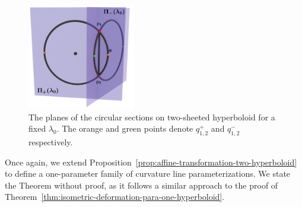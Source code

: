 \documentclass[10pt, a4paper]{article}
\theoremstyle{BoldTopSpacing}
\theoremstyle{BoldTopSpacing}
\theoremstyle{BoldTopSpacing}
\theoremstyle{BoldTopBottomSpacing}
\theoremstyle{BoldTopSpacing}
\theoremstyle{BoldTopBottomSpacing}
\theoremstyle{remark}
\begin{document}
\begin{figure}[H]
    \centering
    \includegraphics[width=0.42\textwidth]{proof_h2_side_view.png}
    \caption[The planes of the circular sections on two-sheeted hyperboloid.]{The planes of the circular sections on two-sheeted hyperboloid for a fixed $\lambda_{0}$. The orange and green points denote $q^{+}_{1,2}$ and $q^{-}_{1,2}$ respectively.}
    \label{fig:proof-h2}
\end{figure}

Once again, we extend Proposition~\ref{prop:affine-transformation-two-hyperboloid} to define a one-parameter family of curvature line parameterizations. We state the Theorem without proof, as it follows a similar approach to the proof of Theorem~\ref{thm:isometric-deformation-para-one-hyperboloid}.
\end{document}
